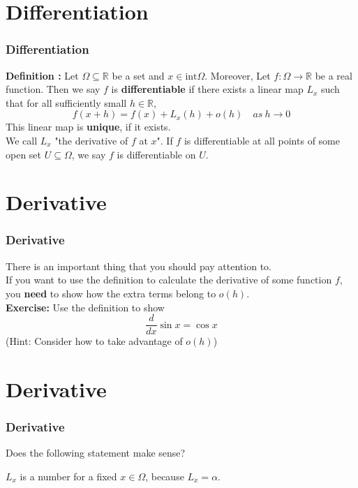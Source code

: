 \documentclass[12pt, t]{beamer}
\begin{document}
\section{Differentiation}
\begin{frame}
    \frametitle{Differentiation}

\textbf{Definition : } 
    Let $\Omega\subseteq\mathbb{R}$ be a set and $x\in \text{int}\Omega$. Moreover, Let $f:\Omega\rightarrow \mathbb{R}$ be a real function. 
    Then we say $f$ is \textbf{differentiable} if there exists a linear map $L_x$ such that for all sufficiently small $h\in\mathbb{R}$, 
\begin{equation*}
    f(x+h)=f(x)+L_x(h)+o(h)\quad as\ h\rightarrow 0
\end{equation*}
This linear map is \textbf{unique}, if it exists. \\
\vspace{1em}
We call $L_x$ "the derivative of $f$ at $x$". If $f$ is differentiable at all points of some open 
set $U\subseteq \Omega$, we say $f$ is differentiable on $U$. 

\end{frame}

\section{Derivative}
\begin{frame}
    \frametitle{Derivative}

There is an important thing that you should pay attention to.\\ 

\vspace{0.5em}
\hspace{1em}
If you want to use the definition to calculate the derivative of some function $f$, you \textbf{need} to show how the extra terms belong to 
$o(h)$.\\

\vspace{1em}
\textbf{Exercise:}
\hspace{1em}
Use the definition to show 
\begin{equation*}
    \frac{d}{dx}\sin{x}=\cos{x}
\end{equation*}
(Hint: Consider how to take advantage of $o(h)$)
\end{frame}

\section{Derivative}
\begin{frame}
    \frametitle{Derivative}
Does the following statement make sense?

\vspace{0.5em}
    \begin{center}
        $L_x$ is a number for a fixed $x\in \Omega$, because $L_x=\alpha$.
    \end{center}
\vspace{0.5em}


\end{frame}
\end{document}

